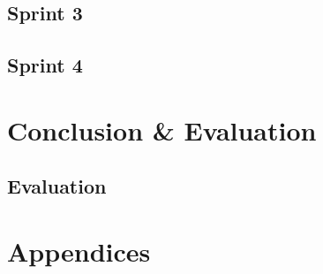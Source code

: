 \documentclass[12pt]{report}
\begin{document}
\chapter{Sprint 3}

\chapter{Sprint 4}

\part{Conclusion \& Evaluation}

\chapter{Evaluation}

	

\part{Appendices}

	\appendix
	
\end{document}
